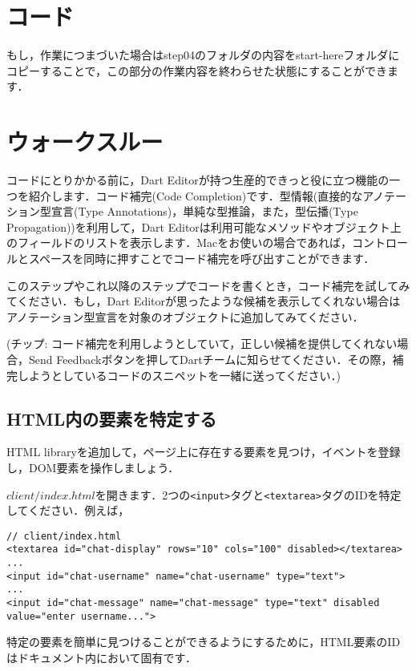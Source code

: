 \section{コード}

もし，作業につまづいた場合はstep04のフォルダの内容をstart-hereフォルダにコピーすることで，この部分の作業内容を終わらせた状態にすることができます．

\section{ウォークスルー}

コードにとりかかる前に，Dart Editorが持つ生産的できっと役に立つ機能の一つを紹介します．コード補完(Code Completion)です．型情報(直接的なアノテーション型宣言(Type Annotations)，単純な型推論，また，型伝播(Type Propagation))を利用して，Dart Editorは利用可能なメソッドやオブジェクト上のフィールドのリストを表示します．Macをお使いの場合であれば，コントロールとスペースを同時に押すことでコード補完を呼び出すことができます．


このステップやこれ以降のステップでコードを書くとき，コード補完を試してみてください．もし，Dart Editorが思ったような候補を表示してくれない場合はアノテーション型宣言を対象のオブジェクトに追加してみてください．

(チップ: コード補完を利用しようとしていて，正しい候補を提供してくれない場合，Send Feedbackボタンを押してDartチームに知らせてください．その際，補完しようとしているコードのスニペットを一緒に送ってください．)

\subsection{HTML内の要素を特定する}

HTML libraryを追加して，ページ上に存在する要素を見つけ，イベントを登録し，DOM要素を操作しましょう．

$ client/index.html $を開きます．2つの\verb|<input>|タグと\verb|<textarea>|タグのIDを特定してください．例えば，

\begin{verbatim}
// client/index.html
<textarea id="chat-display" rows="10" cols="100" disabled></textarea>
...
<input id="chat-username" name="chat-username" type="text">
...
<input id="chat-message" name="chat-message" type="text" disabled
value="enter username...">
\end{verbatim}

特定の要素を簡単に見つけることができるようにするために，HTML要素のIDはドキュメント内において固有です．

